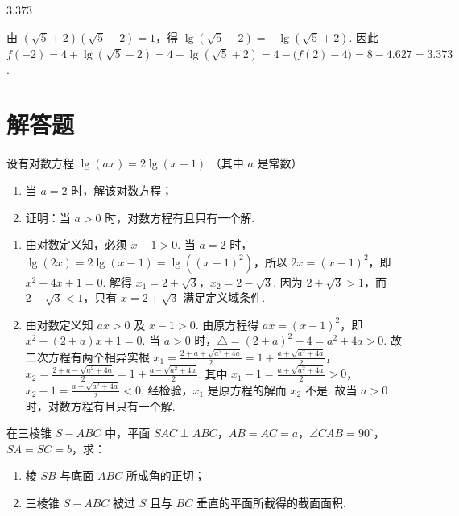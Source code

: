 \documentclass[UTF8,a4paper,oneside,11pt]{ctexbook}
\begin{document}
\begin{answer}
\(3.373\)
\end{answer}

\begin{solution}
由 \(\left(\sqrt{5}+2\right)\left(\sqrt{5}-2\right)=1\)，得 \(\lg\left(\sqrt{5}-2\right)=-\lg\left(\sqrt{5}+2\right)\). 因此
\(
f(-2)=4+\lg\left(\sqrt{5}-2\right)=4-\lg\left(\sqrt{5}+2\right)=4-\bigl(f(2)-4\bigr)=8-4.627=3.373
\).
\end{solution}


\section{解答题}

\begin{problem}

设有对数方程 \(\lg (ax) = 2\lg (x - 1)\) （其中 \(a\) 是常数）.

\begin{enumerate}
\item 当 \(a = 2\) 时，解该对数方程；
\item 证明：当 \(a > 0\) 时，对数方程有且只有一个解.
\end{enumerate}
\end{problem}

\begin{solution}
\begin{enumerate}
\item 由对数定义知，必须 \(x-1>0\). 当 \(a=2\) 时，\(\lg(2x)=2\lg(x-1)=\lg\left((x-1)^2\right)\)，所以 \(2x=(x-1)^2\)，即 \(x^2-4x+1=0\). 解得 \(x_1=2+\sqrt{3}\)，\(x_2=2-\sqrt{3}\). 因为 \(2+\sqrt{3}>1\)，而 \(2-\sqrt{3}<1\)，只有 \(x=2+\sqrt{3}\) 满足定义域条件.

\item 由对数定义知 \(ax>0\) 及 \(x-1>0\). 由原方程得 \(ax=(x-1)^2\)，即 \(x^2-(2+a)x+1=0\). 当 \(a>0\) 时，\(\triangle=(2+a)^2-4=a^2+4a>0\). 故二次方程有两个相异实根 \(x_1=\frac{2+a+\sqrt{a^2+4a}}{2}=1+\frac{a+\sqrt{a^2+4a}}{2}\)，\(x_2=\frac{2+a-\sqrt{a^2+4a}}{2}=1+\frac{a-\sqrt{a^2+4a}}{2}\). 其中 \(x_1-1=\frac{a+\sqrt{a^2+4a}}{2}>0\)，\(x_2-1=\frac{a-\sqrt{a^2+4a}}{2}<0\). 经检验，\(x_1\) 是原方程的解而 \(x_2\) 不是. 故当 \(a>0\) 时，对数方程有且只有一个解.
\end{enumerate}

\end{solution}


\begin{problem}

在三棱锥 \(S-ABC\) 中，平面 \(SAC \perp ABC\)，\(AB=AC=a\)，\(\angle CAB=90^{\circ}\)，\(SA=SC=b\)，求：

\begin{enumerate}
\item 棱 \(SB\) 与底面 \(ABC\) 所成角的正切；
\item 三棱锥 \(S-ABC\) 被过 \(S\) 且与 \(BC\) 垂直的平面所截得的截面面积.
\end{enumerate}

\end{problem}
\end{document}
